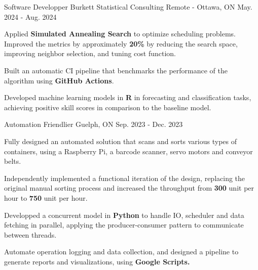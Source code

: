 

\begin{cventries}

\cventry
{Software Developper} %
{Burkett Statistical Consulting} %
{Remote - Ottawa, ON} %
{May. 2024 - Aug. 2024} %
{
  \begin{cvitems} %
    \item {Applied \textbf{Simulated Annealing Search} to optimize scheduling problems. Improved the metrics by approximately \textbf{20\%} by reducing the search space, improving neighbor selection, and tuning cost function.}
    \item {Built an automatic CI pipeline that benchmarks the performance of the algorithm using \textbf{GitHub Actions}.}
    \item {Developed machine learning models in \textbf{R} in forecasting and classification tasks, achieving positive skill scores in comparison to the baseline model.}
  \end{cvitems}
}

\cventry
{Automation} %
{Friendlier} %
{Guelph, ON} %
{Sep. 2023 - Dec. 2023} %
{
  \begin{cvitems} %
    \item {Fully designed an automated solution that scans and sorts various types of containers, using a Raspberry Pi, a barcode scanner, servo motors and conveyor belts.}
    \item {Independently implemented a functional iteration of the design, replacing the original manual sorting process and increased the throughput from \textbf{300} unit per hour to \textbf{750} unit per hour.}
    \item {Developped a concurrent model in \textbf{Python} to handle IO, scheduler and data fetching in parallel, applying the producer-consumer pattern to communicate between threads.}
    \item {Automate operation logging and data collection, and designed a pipeline to generate reports and visualizations, using \textbf{Google Scripts.}}
  \end{cvitems}
}


\end{cventries}
